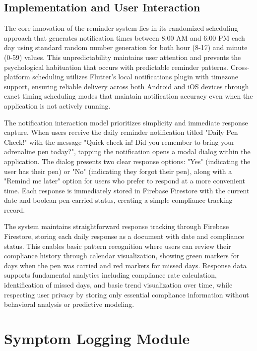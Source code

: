 \documentclass[MScCS]{uccthesis}
\begin{document}
\subsection{Implementation and User Interaction}

The core innovation of the reminder system lies in its randomized scheduling approach that generates notification times between 8:00 AM and 6:00 PM each day using standard random number generation for both hour (8-17) and minute (0-59) values. This unpredictability maintains user attention and prevents the psychological habituation that occurs with predictable reminder patterns. Cross-platform scheduling utilizes Flutter's local notifications plugin with timezone support, ensuring reliable delivery across both Android and iOS devices through exact timing scheduling modes that maintain notification accuracy even when the application is not actively running.

The notification interaction model prioritizes simplicity and immediate response capture. When users receive the daily reminder notification titled "Daily Pen Check!" with the message "Quick check-in! Did you remember to bring your adrenaline pen today?", tapping the notification opens a modal dialog within the application. The dialog presents two clear response options: "Yes" (indicating the user has their pen) or "No" (indicating they forgot their pen), along with a "Remind me later" option for users who prefer to respond at a more convenient time. Each response is immediately stored in Firebase Firestore with the current date and boolean pen-carried status, creating a simple compliance tracking record.

The system maintains straightforward response tracking through Firebase Firestore, storing each daily response as a document with date and compliance status. This enables basic pattern recognition where users can review their compliance history through calendar visualization, showing green markers for days when the pen was carried and red markers for missed days. Response data supports fundamental analytics including compliance rate calculation, identification of missed days, and basic trend visualization over time, while respecting user privacy by storing only essential compliance information without behavioral analysis or predictive modeling.

\section{Symptom Logging Module}
\end{document}

